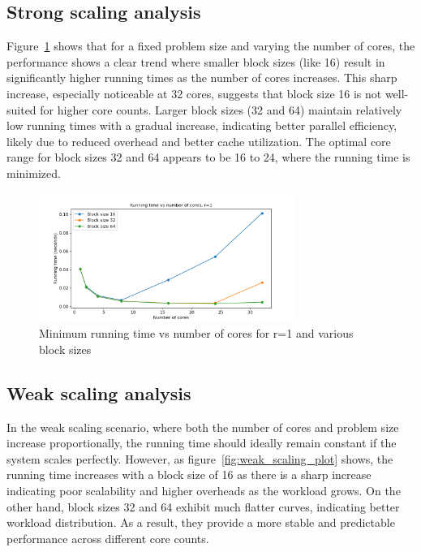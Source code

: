 \documentclass[a4paper,%
7pt,%
DIV12,
headsepline,%
headings=normal,
]{scrartcl}
\begin{document}
\subsection{Strong scaling analysis}

Figure~\ref{fig:strong_scaling_plot} shows that for a fixed problem size and varying the number of cores, the performance shows a clear trend where smaller block sizes (like 16) result in significantly higher running times as the number of cores increases. This sharp increase, especially noticeable at 32 cores, suggests that block size 16 is not well-suited for higher core counts. Larger block sizes (32 and 64) maintain relatively low running times with a gradual increase, indicating better parallel efficiency, likely due to reduced overhead and better cache utilization.  The optimal core range for block sizes 32 and 64 appears to be 16 to 24, where the running time is minimized.

\begin{figure}[htbp]
    \centering
    \includegraphics[width=0.75\textwidth]{./assets/strong_scaling_plot.png}
    \caption{Minimum running time vs number of cores for r=1 and various block sizes}
    \label{fig:strong_scaling_plot}
\end{figure}

\subsection{Weak scaling analysis}

In the weak scaling scenario, where both the number of cores and problem size increase proportionally, the running time should ideally remain constant if the system scales perfectly. However, as figure~\ref{fig:weak_scaling_plot} shows, the running time increases with a block size of 16 as there is a sharp increase indicating poor scalability and higher overheads as the workload grows. On the other hand, block sizes 32 and 64 exhibit much flatter curves, indicating better workload distribution. As a result, they provide a more stable and predictable performance across different core counts. 
\end{document}

